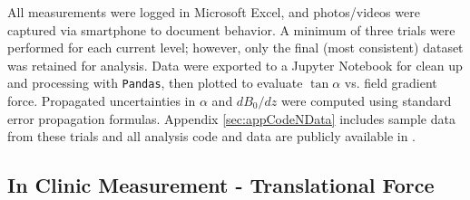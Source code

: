 

All measurements were logged in Microsoft Excel, and photos/videos were captured via smartphone to document behavior. A minimum of three trials were performed for each current level; however, only the final (most consistent) dataset was retained for analysis. Data were exported to a Jupyter Notebook for clean up and processing with \texttt{Pandas}, then plotted to evaluate $\tan \alpha$ vs. field gradient force. Propagated uncertainties in $\alpha$ and $dB_0/dz$ were computed using standard error propagation formulas. Appendix \ref{sec:appCodeNData} includes sample data from these trials and all analysis code and data are publicly available in \cite{juarezluna2025mrisafety}.

\subsection{In Clinic Measurement - Translational Force}
\label{sec:clinicTrans}

